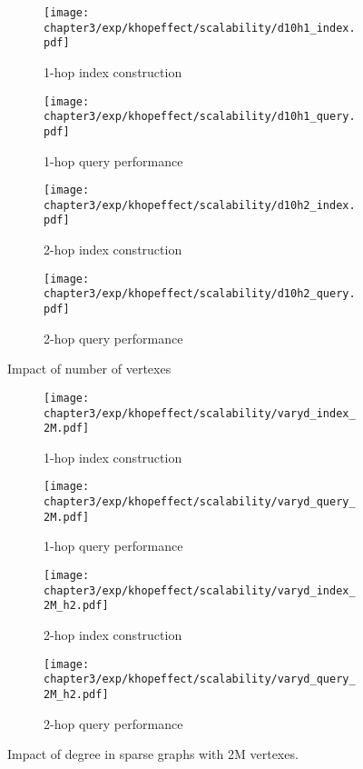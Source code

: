 \begin{figure}[t]
\centering
\begin{subfigure}{0.45\linewidth}
  \centering
  \texttt{[image: chapter3/exp/khopeffect/scalability/d10h1\_index.pdf]}
  \caption{1-hop index construction}
\end{subfigure}
\begin{subfigure}{0.45\linewidth}
  \centering
  \texttt{[image: chapter3/exp/khopeffect/scalability/d10h1\_query.pdf]}
  \caption{1-hop query performance}
\end{subfigure}
\begin{subfigure}{0.45\linewidth}
  \centering
  \texttt{[image: chapter3/exp/khopeffect/scalability/d10h2\_index.pdf]}
  \caption{2-hop index construction}
\end{subfigure}
\begin{subfigure}{0.45\linewidth}
  \centering
  \texttt{[image: chapter3/exp/khopeffect/scalability/d10h2\_query.pdf]}
  \caption{2-hop query performance}
\end{subfigure}
\caption{Impact of number of vertexes }
\label{fig:khop_d10_h1}
\end{figure}

\begin{figure}[t]
\centering
\begin{subfigure}{0.45\linewidth}
  \centering
  \texttt{[image: chapter3/exp/khopeffect/scalability/varyd\_index\_2M.pdf]}
  \caption{1-hop index construction}
\end{subfigure}
\begin{subfigure}{0.45\linewidth}
  \centering
  \texttt{[image: chapter3/exp/khopeffect/scalability/varyd\_query\_2M.pdf]}
  \caption{1-hop query performance}
\end{subfigure}
\begin{subfigure}{0.45\linewidth}
  \centering
  \texttt{[image: chapter3/exp/khopeffect/scalability/varyd\_index\_2M\_h2.pdf]}
  \caption{2-hop index construction}
\end{subfigure}
\begin{subfigure}{0.45\linewidth}
  \centering
  \texttt{[image: chapter3/exp/khopeffect/scalability/varyd\_query\_2M\_h2.pdf]}
  \caption{2-hop query performance}
\end{subfigure}
\caption{Impact of degree in sparse graphs with 2M vertexes. }
\label{fig:khop_v2m}
\end{figure}

